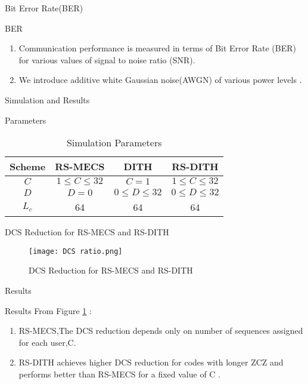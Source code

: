 \documentclass{beamer}
\begin{document}
\begin{frame}{Bit Error Rate(BER)}
\begin{block}{BER}
\begin{enumerate}
    \item Communication performance is measured in terms of Bit Error Rate (BER) for various values of signal to noise ratio (SNR).
    \item We introduce additive white Gaussian noise(AWGN) of various power levels . 
\end{enumerate}
\end{block}
\end{frame}


\begin{frame}{Simulation and Results}
\begin{block}{Parameters}
\begin{table}[]
\centering
\renewcommand{\arraystretch}{1.4}
\begin{tabular}{|c|c|c|c|}
        \hline
        Scheme& RS-MECS & DITH & RS-DITH \\ \hline
        $C$ & $1\leq C \leq 32$& $C =1$ & $1\leq C \leq 32$ \\ \hline
        $D$ & $D =0$ & $0 \leq D \leq 32$ & $0 \leq D \leq 32$ \\ \hline
        $L_{c}$ & 64 & 64 & 64\\ \hline
\end{tabular}
\caption{Simulation Parameters}
\label{tab:my_label2}
\end{table}
\end{block}
\end{frame}


\begin{frame}{DCS Reduction for RS-MECS and RS-DITH}
\begin{figure}
    \centering
    \texttt{[image: DCS ratio.png]}
    \caption{DCS Reduction for RS-MECS and RS-DITH}
    \label{fig:DCS reduction for RS-MECS,RS-DITH}
\end{figure}
\end{frame}

\begin{frame}{ Results}
\begin{block}{Results}
From  Figure \ref{fig:DCS reduction for RS-MECS,RS-DITH} :
\begin{enumerate}
    \item  RS-MECS,The DCS reduction depends only on number of sequences assigned for each user,C.
    \item  RS-DITH achieves higher DCS reduction for codes with longer ZCZ and performs better than RS-MECS for a fixed value of C .
\end{enumerate}
\end{block}
\end{frame}
\end{document}
